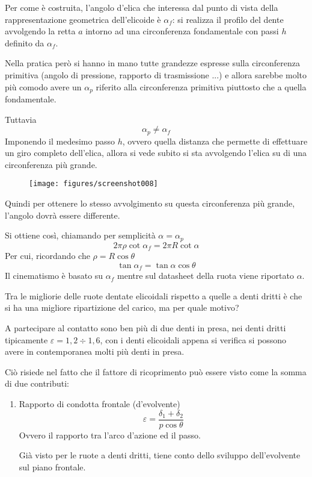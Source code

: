 \documentclass[a4paper, 15pt]{article}
\begin{document}
\begin{adjustwidth}{2in}{}
		Per come è costruita, l'angolo d'elica che interessa dal punto di vista della rappresentazione geometrica dell'elicoide è $\alpha_f$: si realizza il profilo del dente avvolgendo la retta $a$ intorno ad una circonferenza fondamentale con passi $h$ definito da $\alpha_f$. \newline 
		
		Nella pratica però si hanno in mano tutte grandezze espresse sulla circonferenza primitiva (angolo di pressione, rapporto di trasmissione ...) e allora sarebbe molto più comodo avere un $\alpha_p$ riferito alla circonferenza primitiva piuttosto che a quella fondamentale. 
		
		Tuttavia
		\[\alpha_p\ne\alpha_f\]
		Imponendo il medesimo passo $h$, ovvero quella distanza che permette di effettuare un giro completo dell'elica, allora si vede subito si sta avvolgendo l'elica su di una circonferenza più grande. 
		\begin{figure}[H]
			\centering
			\texttt{[image: figures/screenshot008]}
			\label{fig:screenshot008}
		\end{figure}
		Quindi per ottenere lo stesso avvolgimento su questa circonferenza più grande, l'angolo dovrà essere differente. 
		
		Si ottiene così, chiamando per semplicità $\alpha=\alpha_p$
		\[2\pi\rho\cot\alpha_f = 2\pi R\cot\alpha\]
		Per cui, ricordando che $\rho = R\cos\theta$
		\[\tan\alpha_f = \tan\alpha\cos\theta\]
		Il cinematismo è basato su $\alpha_f$ mentre sul datasheet della ruota viene riportato $\alpha$. \newline 
		
		Tra le migliorie delle ruote dentate elicoidali rispetto a quelle a denti dritti è che si ha una migliore ripartizione del carico, ma per quale motivo? 
		
		A partecipare al contatto sono ben più di due denti in presa, nei denti dritti tipicamente $\varepsilon= 1,2\div1,6$, con i denti elicoidali appena si verifica si possono avere in contemporanea molti più denti in presa. 
		
		Ciò risiede nel fatto che il fattore di ricoprimento può essere visto come la somma di due contributi: 
		\begin{enumerate}
			\item Rapporto di condotta frontale (d'evolvente)
			\[\varepsilon = \dfrac{\delta_1 + \delta_2}{p\cos\theta}\]
			Ovvero il rapporto tra l'arco d'azione ed il passo. 
			
			Già visto per le ruote a denti dritti, tiene conto dello sviluppo dell'evolvente sul piano frontale.
			

\end{enumerate}
\end{adjustwidth}
\end{document}
